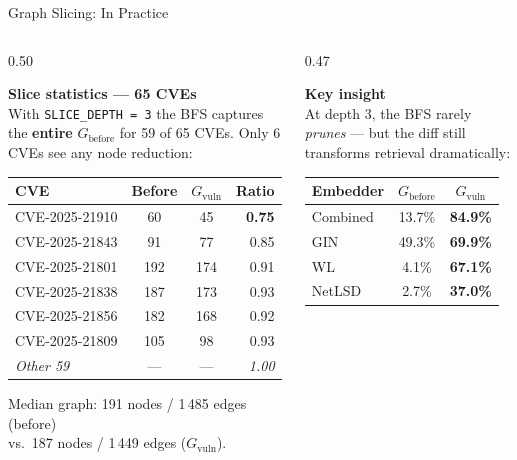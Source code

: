 \documentclass[aspectratio=169,10pt]{beamer}
\begin{document}
\begin{frame}{Graph Slicing: In Practice}
\begin{columns}[T]
\begin{column}{0.50\textwidth}

  \textbf{Slice statistics — 65 CVEs}\\[3pt]
  With \texttt{SLICE\_DEPTH\,=\,3} the BFS captures the
  \textbf{entire} $G_{\text{before}}$ for 59 of 65 CVEs.
  Only 6 CVEs see any node reduction:

  \vspace{0.5em}
  {\scriptsize
  \renewcommand{\arraystretch}{1.1}
  \begin{tabular}{lccr}
    \toprule
    \textbf{CVE} & \textbf{Before} & \textbf{$G_{\text{vuln}}$} & \textbf{Ratio} \\
    \midrule
    CVE-2025-21910 & 60  & 45  & \textbf{0.75} \\
    CVE-2025-21843 & 91  & 77  & 0.85 \\
    CVE-2025-21801 & 192 & 174 & 0.91 \\
    CVE-2025-21838 & 187 & 173 & 0.93 \\
    CVE-2025-21856 & 182 & 168 & 0.92 \\
    CVE-2025-21809 & 105 & 98  & 0.93 \\
    \midrule
    \emph{Other 59} & — & — & \emph{1.00} \\
    \bottomrule
  \end{tabular}}

  \vspace{0.5em}
  {\scriptsize\color{black!55}
  Median graph: 191 nodes / 1\,485 edges (before)\\
  vs.\ 187 nodes / 1\,449 edges ($G_{\text{vuln}}$).}

\end{column}
\begin{column}{0.47\textwidth}

  \textbf{Key insight}\\[3pt]
  At depth 3, the BFS rarely \emph{prunes} — but the diff
  still transforms retrieval dramatically:

  \vspace{0.5em}
  \centering
  {\scriptsize
  \renewcommand{\arraystretch}{1.1}
  \begin{tabular}{lcc}
    \toprule
    \textbf{Embedder} & \textbf{$G_{\text{before}}$} & \textbf{$G_{\text{vuln}}$} \\
    \midrule
    Combined & 13.7\% & \textbf{84.9\%} \\
    GIN      & 49.3\% & \textbf{69.9\%} \\
    WL       &  4.1\% & \textbf{67.1\%} \\
    NetLSD   &  2.7\% & \textbf{37.0\%} \\
    \bottomrule
  \end{tabular}}


\end{column}
\end{columns}
\end{frame}
\end{document}
